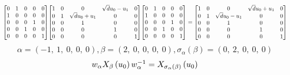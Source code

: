 \documentclass[11pt]{article}
\theoremstyle{definition}
\begin{document}
\[
\scaletoalign{\textwidth}{{\left[\begin{matrix}0 & 1 & 0 & 0 & 0\\1 & 0 & 0 & 0 & 0\\0 & 0 & 0 & 1 & 0\\0 & 0 & 1 & 0 & 0\\0 & 0 & 0 & 0 & 1\end{matrix}\right]} {\left[\begin{matrix}1 & 0 & 0 & \sqrt{d} u_{0} - u_{1} & 0\\0 & 1 & \sqrt{d} u_{0} + u_{1} & 0 & 0\\0 & 0 & 1 & 0 & 0\\0 & 0 & 0 & 1 & 0\\0 & 0 & 0 & 0 & 1\end{matrix}\right]} {\left[\begin{matrix}0 & 1 & 0 & 0 & 0\\1 & 0 & 0 & 0 & 0\\0 & 0 & 0 & 1 & 0\\0 & 0 & 1 & 0 & 0\\0 & 0 & 0 & 0 & 1\end{matrix}\right]} = {\left[\begin{matrix}1 & 0 & 0 & \sqrt{d} u_{0} + u_{1} & 0\\0 & 1 & \sqrt{d} u_{0} - u_{1} & 0 & 0\\0 & 0 & 1 & 0 & 0\\0 & 0 & 0 & 1 & 0\\0 & 0 & 0 & 0 & 1\end{matrix}\right]}}
\]
\[
\alpha = \left( -1, \  1, \  0, \  0, \  0\right), \beta = \left( 2, \  0, \  0, \  0, \  0\right), \sigma_{\alpha}(\beta) = \left( 0, \  2, \  0, \  0, \  0\right)
\]
\[
\scaletoalign{\textwidth}{w_{\alpha} X_{\beta}\left(u_{0}\right) w_{\alpha}^{-1} = X_{\sigma_{\alpha}\left(\beta\right)}\left(u_{0}\right)}
\]
\end{document}
